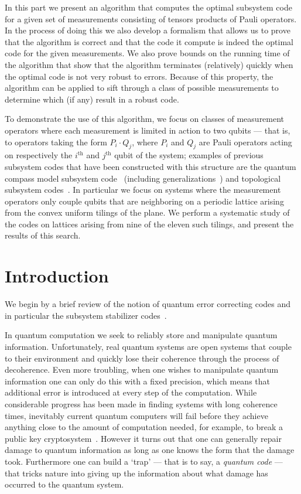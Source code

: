 \documentclass[12pt]{amsbook}
\theoremstyle{plain}
\theoremstyle{definition}
\theoremstyle{remark}
\begin{document}
In this part we present an algorithm that computes the optimal subsystem code for a given set of measurements consisting of tensors products of Pauli operators.  In the process of doing this we also develop a formalism that allows us to prove that the algorithm is correct and that the code it compute is indeed the optimal code for the given measurements.  We also prove bounds on the running time of the algorithm that show that the algorithm terminates (relatively) quickly when the optimal code is not very robust to errors.  Because of this property, the algorithm can be applied to sift through a class of possible measurements to determine which (if any) result in a robust code.

To demonstrate the use of this algorithm, we focus on classes of measurement operators where each measurement is limited in action to two qubits --- that is, to operators taking the form $P_i \cdot Q_j$, where $P_i$ and $Q_j$ are Pauli operators acting on respectively the $i^{\text{th}}$ and $j^{\text{th}}$ qubit of the system;  examples of previous subsystem codes that have been constructed with this structure are the quantum compass model subsystem code~\cite{Bacon:06a} (including generalizations~\cite{Bacon:06b,Bravyi:10a}) and topological subsystem codes~\cite{Bombin:10a}.  In particular we focus on systems where the measurement operators only couple qubits that are neighboring on a periodic lattice arising from the convex uniform tilings of the plane.  We perform a systematic study of the codes on lattices arising from nine of the eleven such tilings, and present the results of this search.
\chapter{Introduction}

We begin by a brief review of the notion of quantum error correcting codes and in particular the subsystem stabilizer codes~\cite{Poulin:05a}.

In quantum computation we seek to reliably store and manipulate quantum information.  Unfortunately, real quantum systems are open systems that couple to their environment and quickly lose their coherence through the process of decoherence.  Even more troubling, when one wishes to manipulate quantum information one can only do this with a fixed precision, which means that additional error is introduced at every step of the computation.  While considerable progress has been made in finding systems with long coherence times, inevitably current quantum computers will fail before they achieve anything close to the amount of computation needed, for example, to break a public key cryptosystem~\cite{Shor:94a}.  However it turns out that one can generally repair damage to quantum information as long as one knows the form that the damage took.  Furthermore one can build a `trap' --- that is to say, a
\emph{quantum code} --- that tricks nature into giving up the information about what damage has occurred to the quantum system.
\end{document}
